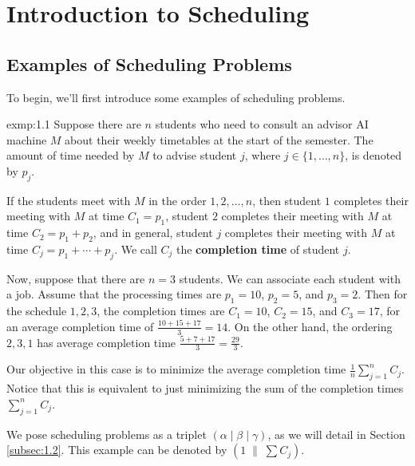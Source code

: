 \section{Introduction to Scheduling}\label{sec:1}

\subsection{Examples of Scheduling Problems}\label{subsec:1.1}
To begin, we'll first introduce some examples of scheduling problems. 

\begin{exmp}{exmp:1.1}
    Suppose there are $n$ students who need to consult an advisor AI machine 
    $M$ about their weekly timetables at the start of the semester. The 
    amount of time needed by $M$ to advise student $j$, where 
    $j \in \{1, \dots, n\}$, is denoted by $p_j$. 

    If the students meet with $M$ in the order $1, 2, \dots, n$, then student 
    $1$ completes their meeting with $M$ at time $C_1 = p_1$, student $2$ 
    completes their meeting with $M$ at time $C_2 = p_1 + p_2$, and in general, 
    student $j$ completes their meeting with $M$ at time $C_j = p_1 
    + \cdots + p_j$. We call $C_j$ the {\bf completion time} of student $j$. 

    Now, suppose that there are $n = 3$ students. We can associate each 
    student with a job. Assume that the processing times are 
    $p_1 = 10$, $p_2 = 5$, and $p_3 = 2$. Then for the schedule $1, 2, 3$, 
    the completion times are $C_1 = 10$, $C_2 = 15$, and $C_3 = 17$, for 
    an average completion time of $\frac{10+15+17}{3} = 14$. On the 
    other hand, the ordering $2, 3, 1$ has average completion time 
    $\frac{5+7+17}{3} = \frac{29}{3}$. 

    Our objective in this case is to minimize the average completion time 
    $\frac1n \sum_{j=1}^n C_j$. Notice that this is equivalent to 
    just minimizing the sum of the completion times $\sum_{j=1}^n C_j$. 

    We pose scheduling problems as a triplet $(\alpha \mid \beta \mid \gamma)$, 
    as we will detail in Section \ref{subsec:1.2}. This example can be denoted by 
    $(1\;\|\;\sum C_j)$.
\end{exmp}

